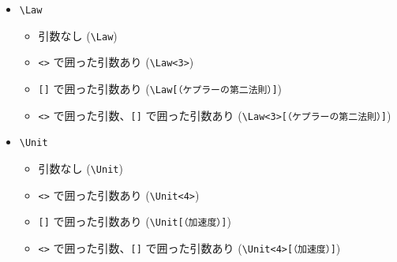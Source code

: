 \documentclass[oneside,10pt,a4paper]{jsarticle}
\begin{document}
\begin{itemize}
    \newpage
    \item \verb|\Law|
      \begin{itemize}
        \item 引数なし (\verb|\Law|)
          \begin{quote}
            \Law
          \end{quote}
        \item \verb|<>| で囲った引数あり (\verb|\Law<3>|)
          \begin{quote}
          \end{quote}
        \item \verb|[]| で囲った引数あり (\verb|\Law[（ケプラーの第二法則）]|)
          \begin{quote}
            \Law[（ケプラーの第二法則）]
          \end{quote}
        \item \verb|<>| で囲った引数、\verb|[]| で囲った引数あり (\verb|\Law<3>[（ケプラーの第二法則）]|)
          \begin{quote}
          \end{quote}
      \end{itemize}
    \item \verb|\Unit|
      \begin{itemize}
        \item 引数なし (\verb|\Unit|)
          \begin{quote}
            \Unit
          \end{quote}
        \item \verb|<>| で囲った引数あり (\verb|\Unit<4>|)
          \begin{quote}
          \end{quote}
        \item \verb|[]| で囲った引数あり (\verb|\Unit[（加速度）]|)
          \begin{quote}
            \Unit[（加速度）]
          \end{quote}
        \item \verb|<>| で囲った引数、\verb|[]| で囲った引数あり (\verb|\Unit<4>[（加速度）]|)
          \begin{quote}
          \end{quote}
      \end{itemize}
  \end{itemize}
\end{document}
